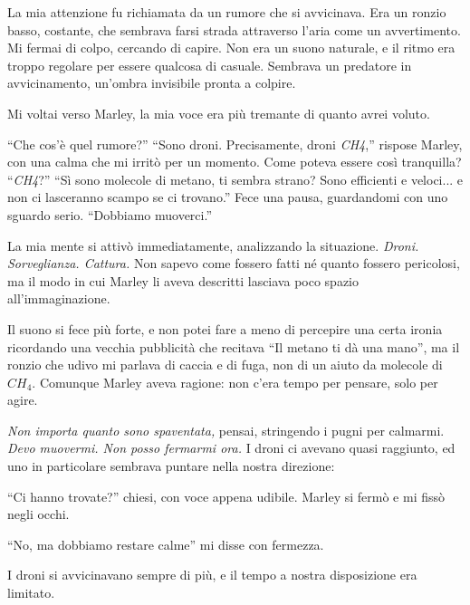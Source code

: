 La mia attenzione fu richiamata da un rumore che si avvicinava. Era un ronzio basso, costante, che sembrava farsi strada attraverso l'aria come un avvertimento. Mi fermai di colpo, cercando di capire. Non era un suono naturale, e il ritmo era troppo regolare per essere qualcosa di casuale. Sembrava un predatore in avvicinamento, un'ombra invisibile pronta a colpire.

Mi voltai verso Marley, la mia voce era più tremante di quanto avrei voluto.

\begin{dialogue}  \enquote{Che cos’è quel rumore?}  \enquote{Sono droni. Precisamente, droni \textit{CH4},} rispose Marley, con una calma che mi irritò per un momento. Come poteva essere così tranquilla?  \enquote{\textit{CH4}?}  \enquote{Sì sono molecole di metano, ti sembra strano? Sono efficienti e veloci... e non ci lasceranno scampo se ci trovano.} Fece una pausa, guardandomi con uno sguardo serio. \enquote{Dobbiamo muoverci.} \end{dialogue}

La mia mente si attivò immediatamente, analizzando la situazione. \textit{Droni. Sorveglianza. Cattura.} Non sapevo come fossero fatti né quanto fossero pericolosi, ma il modo in cui Marley li aveva descritti lasciava poco spazio all’immaginazione. 

Il suono si fece più forte, e non potei fare a meno di percepire una certa ironia ricordando una vecchia pubblicità che recitava ``Il metano ti dà una mano'',  ma il ronzio che udivo mi parlava di caccia e di fuga, non di un aiuto da molecole di $CH_4$. Comunque Marley aveva ragione: non c’era tempo per pensare, solo per agire.

\textit{Non importa quanto sono spaventata,} pensai, stringendo i pugni per calmarmi. \textit{Devo muovermi. Non posso fermarmi ora.}
I droni ci avevano quasi raggiunto, ed uno in particolare sembrava puntare nella nostra direzione:
\begin{dialogue}
 ``Ci hanno trovate?'' chiesi, con  voce appena udibile. Marley si fermò e mi fissò negli occhi.
\end{dialogue}

\begin{dialogue}
 ``No, ma dobbiamo restare calme'' mi disse con  fermezza.
\end{dialogue}
 I droni si avvicinavano sempre di più, e il tempo a nostra disposizione era limitato. 


